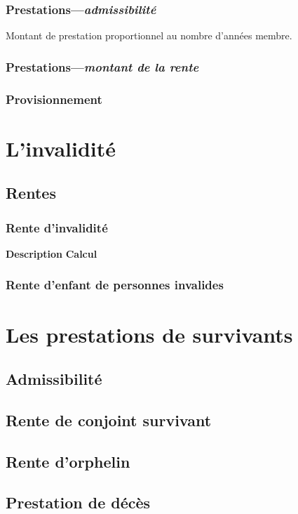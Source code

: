 \documentclass[10pt, french]{article}
\begin{document}
\begin{multicols*}{3}
\subsubsection*{Prestations---\textit{admissibilité}}
Montant de prestation proportionnel au nombre d'années membre.

\subsubsection*{Prestations---\textit{montant de la rente}}

\subsubsection*{Provisionnement}

\section*{L'invalidité}

\subsection{Rentes}

\subsubsection{Rente d'invalidité}

\textbf{Description}
\textbf{Calcul}

\subsubsection{Rente d'enfant de personnes invalides}

\section*{Les prestations de survivants}

\subsection*{Admissibilité}

\subsection*{Rente de conjoint survivant}

\subsection*{Rente d'orphelin}

\subsection*{Prestation de décès}

\end{multicols*}
\end{document}
